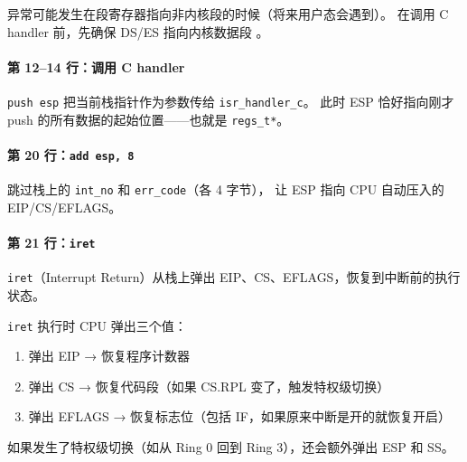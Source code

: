异常可能发生在段寄存器指向非内核段的时候（将来用户态会遇到）。
在调用 C handler 前，先确保 DS/ES 指向内核数据段 。

\paragraph{第 12--14 行：调用 C handler}

\texttt{push esp} 把当前栈指针作为参数传给 \texttt{isr\_handler\_c}。
此时 ESP 恰好指向刚才 push 的所有数据的起始位置——也就是 \texttt{regs\_t*}。

\paragraph{第 20 行：\texttt{add esp, 8}}

跳过栈上的 \texttt{int\_no} 和 \texttt{err\_code}（各 4 字节），
让 ESP 指向 CPU 自动压入的 EIP/CS/EFLAGS。

\paragraph{第 21 行：\texttt{iret}}

\texttt{iret}（Interrupt Return）从栈上弹出 EIP、CS、EFLAGS，恢复到中断前的执行状态。

\begin{cpustate}
\texttt{iret} 执行时 CPU 弹出三个值：

\begin{enumerate}
  \item 弹出 EIP → 恢复程序计数器
  \item 弹出 CS → 恢复代码段（如果 CS.RPL 变了，触发特权级切换）
  \item 弹出 EFLAGS → 恢复标志位（包括 IF，如果原来中断是开的就恢复开启）
\end{enumerate}

如果发生了特权级切换（如从 Ring 0 回到 Ring 3），还会额外弹出 ESP 和 SS。
\end{cpustate}


